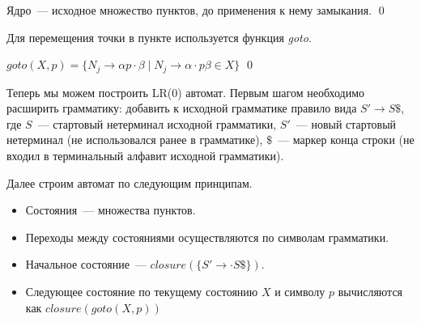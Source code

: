 \begin{definition}
Ядро~--- исходное множество пунктов, до применения к нему замыкания.
\qed
\end{definition}

Для перемещения точки в пункте используется функция \textit{goto}.

\begin{definition}
$goto(X,p)  = \{N_j \rightarrow \alpha p \cdot \beta \mid N_j \rightarrow \alpha\cdot p\beta \in X \}$
\qed
\end{definition}

Теперь мы можем построить LR(0) автомат.
Первым шагом необходимо расширить грамматику: добавить к исходной грамматике правило вида $S' \to S \$$, где $S$~--- стартовый нетерминал исходной грамматики, $S'$~--- новый стартовый нетерминал (не использовался ранее в грамматике), $\$$~--- маркер конца строки (не входил в терминальный алфавит исходной грамматики).

Далее строим автомат по следующим принципам.

\begin{itemize}
    \item Состояния~--- множества пунктов.
    \item Переходы между состояниями осуществляются по символам грамматики.
    \item Начальное состояние~--- $closure(\{S'\to
    \cdot S \$\})$.
    \item Следующее состояние по текущему состоянию $X$ и символу $p$ вычисляются как $closure(goto(X, p))$
  \end{itemize}

